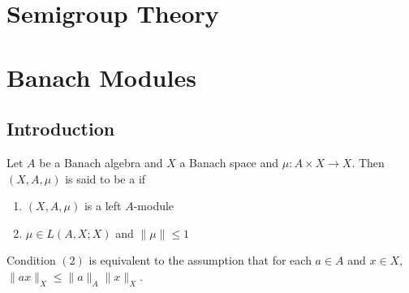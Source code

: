 \documentclass{book}
\begin{document}
\newpage
\chapter{Semigroup Theory}
	
	
	
	
	
	
	
	
	
	
	
	
	
	
	
	
	
	
	
	
	
	
	
	
	
	
	
	
	
	
	
	\newpage
	
	\chapter{Banach Modules}
	
	\section{Introduction}
	
	\begin{defn}
		Let $A$ be a Banach algebra and $X$ a Banach space and $\mu: A \times X \rightarrow X$. Then $(X, A, \mu)$ is said to be a  if 
		\begin{enumerate}
			\item $(X, A, \mu)$ is a left $A$-module
			\item $\mu \in L(A, X; X)$ and $\|\mu\| \leq 1$
		\end{enumerate}
	\end{defn}
	
	\begin{note}
		Condition $(2)$ is equivalent to the assumption that for each $a \in A$ and $x \in X$, $\|ax\|_X \leq \|a\|_A\|x\|_X$. 
	\end{note}
	
	
	
	
	
	
	
	
	
	
	
	
	
	
	
	
	
\end{document}
